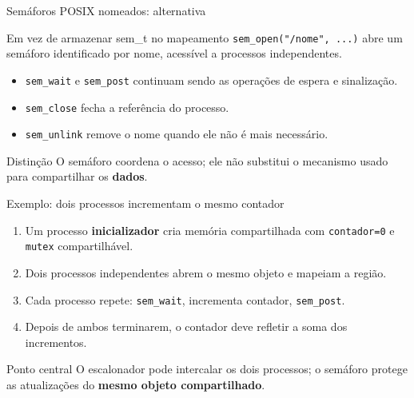 \documentclass[aspectratio=169,11pt]{beamer}
\begin{document}
\begin{frame}{Semáforos POSIX nomeados: alternativa}
\small
\begin{block}{Em vez de armazenar sem\_t no mapeamento}
\texttt{sem\_open("/nome", ...)} abre um semáforo identificado por nome, acessível a processos independentes.
\end{block}
\begin{itemize}
\item \texttt{sem\_wait} e \texttt{sem\_post} continuam sendo as operações de espera e sinalização.
\item \texttt{sem\_close} fecha a referência do processo.
\item \texttt{sem\_unlink} remove o nome quando ele não é mais necessário.
\end{itemize}
\begin{alertblock}{Distinção}
O semáforo coordena o acesso; ele não substitui o mecanismo usado para compartilhar os \textbf{dados}.
\end{alertblock}
\end{frame}

\begin{frame}{Exemplo: dois processos incrementam o mesmo contador}
\small
\begin{enumerate}
\item Um processo \textbf{inicializador} cria memória compartilhada com \texttt{contador=0} e \texttt{mutex} compartilhável.
\item Dois processos independentes abrem o mesmo objeto e mapeiam a região.
\item Cada processo repete: \texttt{sem\_wait}, incrementa contador, \texttt{sem\_post}.
\item Depois de ambos terminarem, o contador deve refletir a soma dos incrementos.
\end{enumerate}
\begin{alertblock}{Ponto central}
O escalonador pode intercalar os dois processos; o semáforo protege as atualizações do \textbf{mesmo objeto compartilhado}.
\end{alertblock}
\end{frame}
\end{document}
